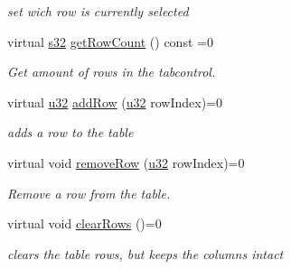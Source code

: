 \begin{DoxyCompactItemize}
\begin{DoxyCompactList}\small\item\em set wich row is currently selected \end{DoxyCompactList}\item 
\mbox{\label{classirr_1_1gui_1_1IGUITable_a261073c7350cef8292fa2497930b463b}} 
virtual \hyperlink{namespaceirr_ac66849b7a6ed16e30ebede579f9b47c6}{s32} \hyperlink{classirr_1_1gui_1_1IGUITable_a261073c7350cef8292fa2497930b463b}{get\+Row\+Count} () const =0
\begin{DoxyCompactList}\small\item\em Get amount of rows in the tabcontrol. \end{DoxyCompactList}\item 
virtual \hyperlink{namespaceirr_a0416a53257075833e7002efd0a18e804}{u32} \hyperlink{classirr_1_1gui_1_1IGUITable_a2cd5f569985f88c6fe55d99a86b79ca8}{add\+Row} (\hyperlink{namespaceirr_a0416a53257075833e7002efd0a18e804}{u32} row\+Index)=0
\begin{DoxyCompactList}\small\item\em adds a row to the table \end{DoxyCompactList}\item 
\mbox{\label{classirr_1_1gui_1_1IGUITable_abff899c09095fac911e0d55b43ab7838}} 
virtual void \hyperlink{classirr_1_1gui_1_1IGUITable_abff899c09095fac911e0d55b43ab7838}{remove\+Row} (\hyperlink{namespaceirr_a0416a53257075833e7002efd0a18e804}{u32} row\+Index)=0
\begin{DoxyCompactList}\small\item\em Remove a row from the table. \end{DoxyCompactList}\item 
\mbox{\label{classirr_1_1gui_1_1IGUITable_a492adc813893d062f66c35dafa653fad}} 
virtual void \hyperlink{classirr_1_1gui_1_1IGUITable_a492adc813893d062f66c35dafa653fad}{clear\+Rows} ()=0
\begin{DoxyCompactList}\small\item\em clears the table rows, but keeps the columns intact \end{DoxyCompactList}\item 
\mbox{\label{classirr_1_1gui_1_1IGUITable_a9b54731c433912b00b3393c98a53ca68}} 

\end{DoxyCompactItemize}
